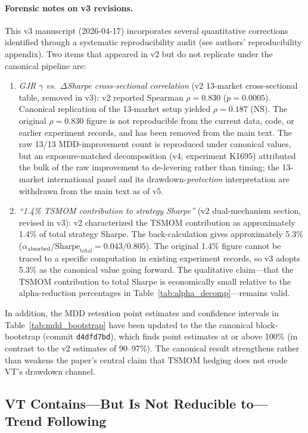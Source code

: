 \paragraph{Forensic notes on v3 revisions.} This v3 manuscript (2026-04-17) incorporates several quantitative corrections identified through a systematic reproducibility audit (see authors' reproducibility appendix). Two items that appeared in v2 but do not replicate under the canonical pipeline are:
\begin{enumerate}
\item \emph{GJR $\gamma$ vs.\ $\Delta$Sharpe cross-sectional correlation} (v2 13-market cross-sectional table, removed in v3): v2 reported Spearman $\rho = 0.830$ ($p = 0.0005$). Canonical replication of the 13-market setup yielded $\rho = 0.187$ (NS). The original $\rho = 0.830$ figure is not reproducible from the current data, code, or earlier experiment records, and has been removed from the main text. The raw 13/13 MDD-improvement count is reproduced under canonical values, but an exposure-matched decomposition (v4; experiment K1695) attributed the bulk of the raw improvement to de-levering rather than timing; the 13-market international panel and its drawdown-\emph{protection} interpretation are withdrawn from the main text as of v5.
\item \emph{``1.4\% TSMOM contribution to strategy Sharpe''} (v2 dual-mechanism section, revised in v3): v2 characterized the TSMOM contribution as approximately 1.4\% of total strategy Sharpe. The back-calculation gives approximately 5.3\% ($\alpha_{\text{absorbed}}/\text{Sharpe}_{\text{total}} = 0.043/0.805$). The original 1.4\% figure cannot be traced to a specific computation in existing experiment records, so v3 adopts 5.3\% as the canonical value going forward. The qualitative claim---that the TSMOM contribution to total Sharpe is economically small relative to the alpha-reduction percentages in Table~\ref{tab:alpha_decomp}---remains valid.
\end{enumerate}
In addition, the MDD retention point estimates and confidence intervals in Table~\ref{tab:mdd_bootstrap} have been updated to the the canonical block-bootstrap (commit \texttt{d4dfd7bd}), which finds point estimates at or above 100\% (in contrast to the v2 estimates of 90--97\%). The canonical result strengthens rather than weakens the paper's central claim that TSMOM hedging does not erode VT's drawdown channel.

\subsection{VT Contains---But Is Not Reducible to---Trend Following}

